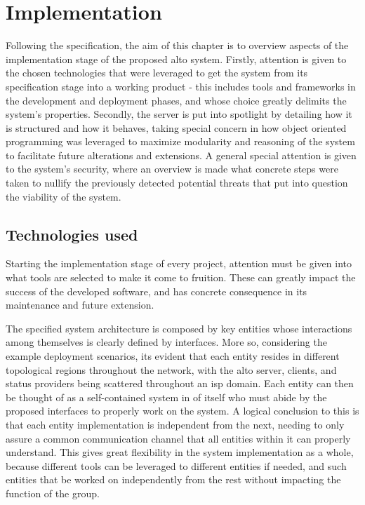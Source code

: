 \chapter{Implementation}

    Following the specification, the aim of this chapter is to overview aspects of the implementation stage of the proposed \gls{alto} system.
    Firstly, attention is given to the chosen technologies that were leveraged to get the system from its specification stage into a working product - this includes tools and frameworks in the development and deployment phases, and whose choice greatly delimits the system's properties.
    Secondly, the server is put into spotlight by detailing how it is structured and how it behaves, taking special concern in how object oriented programming was leveraged to maximize modularity and reasoning of the system to facilitate future alterations and extensions.
    A general special attention is given to the system's security, where an overview is made what concrete steps were taken to nullify the previously detected potential threats that put into question the viability of the system.

\section{Technologies used}

    Starting the implementation stage of every project, attention must be given into what tools are selected to make it come to fruition.
    These can greatly impact the success of the developed software, and has concrete consequence in its maintenance and future extension.

    The specified system architecture is composed by key entities whose interactions among themselves is clearly defined by interfaces.
    More so, considering the example deployment scenarios, its evident that each entity resides in different topological regions throughout the network, with the \gls{alto} server, clients, and status providers being scattered throughout an \gls{isp} domain.
    Each entity can then be thought of as a self-contained system in of itself who must abide by the proposed interfaces to properly work on the system.
    A logical conclusion to this is that each entity implementation is independent from the next, needing to only assure a common communication channel that all entities within it can properly understand.
    This gives great flexibility in the system implementation as a whole, because different tools can be leveraged to different entities if needed, and such entities that be worked on independently from the rest without impacting the function of the group.

